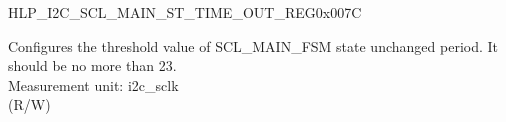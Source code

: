 \begin{register}{H}{LP\_I2C\_SCL\_MAIN\_ST\_TIME\_OUT\_REG}{0x007C}\label{regdesc:LPI2CSCLMAINSTTIMEOUTREG}
%
%
\regnewline%
\begin{regdesc}\begin{reglist}
\label{fielddesc:LPI2CSCLMAINSTTOI2C}\item [LP\_I2C\_SCL\_MAIN\_ST\_TO\_I2C] Configures the threshold value of SCL\_MAIN\_FSM state unchanged period. It should be no more than 23.\\
Measurement unit: i2c\_sclk \\ (R/W)
\end{reglist}\end{regdesc}
\end{register}


